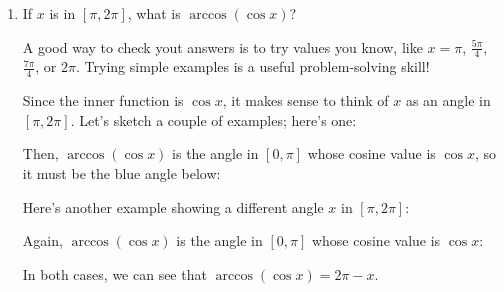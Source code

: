 \documentclass[main]{subfiles}
\begin{document}
\begin{enumerate}[resume]
\begin{enumerate}[topsep=0pt]
  \item

    \begin{problem}[\stretch{0.5}]
      If $x$ is in $[\pi, 2 \pi]$, what is $\arccos(\cos x)$?

      A good way to check yout answers is to try values you know,
      like $x=\pi$, $\frac{5\pi}{4}$, $\frac{7\pi}{4}$, or $2\pi$.
      Trying simple examples is a useful problem-solving skill!
    \end{problem}

    \begin{solution}
      Since the inner function is $\cos x$, it makes sense to think of $x$
      as an angle in $[\pi, 2 \pi]$.  Let's sketch a couple of examples;
      here's one:
      \begin{center}
        \begin{tikzangle}[angle=7*pi/6, label=$x$, func=cos,
          functick=$\cos x$, labelpos=0.6]
        \end{tikzangle}
      \end{center}
      Then, $\arccos(\cos x)$ is the angle in $[0, \pi]$ whose cosine
      value is $\cos x$, so it must be the blue angle below:
      \begin{center}
        \begin{tikzangle}[angle=7*pi/6, label=$x$, labelpos=0.8, func=cos,
          functick=$\cos x$, secondangle=5*pi/6, secondlabel=$\arccos(\cos
          x)$, seconddistance=0.2, secondlabelpos=0.05]
        \end{tikzangle}
      \end{center}
      Here's another example showing a different angle $x$ in $[\pi,
      2\pi]$:
      \begin{center}
        \begin{tikzangle}[angle=3*pi/2+pi/6, label=$x$, func=cos,
          functick=$\cos x$, labelpos=0.4]
        \end{tikzangle}
      \end{center}
      Again, $\arccos(\cos x)$ is the angle in $[0, \pi]$ whose cosine
      value is $\cos x$:
      \begin{center}
        \begin{tikzangle}[angle=3*pi/2+pi/6, label=$x$, func=cos,
          functick=$\cos x$, labelpos=0.4, secondangle=pi/2-pi/6,
          secondlabel=$\arccos(\cos x)$, seconddistance=0.2,
          secondlabelpos=0.2]
        \end{tikzangle}
      \end{center}
      In both cases, we can see that $\arccos(\cos x) = \boxed{2 \pi - x}$.
    \end{solution}


\end{enumerate}
\end{enumerate}
\end{document}
